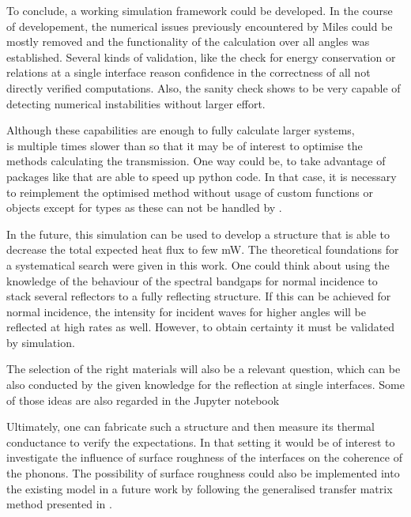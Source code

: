 To conclude, a working simulation framework could be developed. In the course
of developement, the numerical issues previously encountered by Miles could be
mostly removed and the functionality of the calculation over all angles was
established. Several kinds
of validation, like the check for energy conservation or relations at a single
interface reason confidence in the correctness of all not directly verified
computations. Also, the sanity check shows to be very capable of detecting
numerical instabilities without larger effort.

Although these capabilities are enough to fully calculate larger systems,\\
 is multiple times slower than 
so that it may be of interest to optimise the methods calculating the
transmission. One way could be, to take advantage of packages like 
that are able to speed up python code. In that case, it is necessary to
reimplement the optimised method without usage of custom functions or objects
except for  types as these can not be handled by .

In the future, this simulation can be used to develop a structure that is able
to decrease the total expected heat flux to few mW. The theoretical foundations
for a systematical search were given in this work. One could think about using
the knowledge of the behaviour of the spectral bandgaps for normal incidence
to stack several reflectors to a fully reflecting structure. If this can be
achieved for normal incidence, the intensity for incident waves for higher
angles will be reflected at high rates as well. However, to obtain certainty it
must be validated by simulation.

The selection of the right materials will also be a relevant question, which
can be also conducted by the given knowledge for the reflection at single
interfaces. Some of those ideas are also regarded in the Jupyter notebook

Ultimately, one can fabricate such a structure and then measure its thermal conductance
to verify the expectations. In that setting it would be of interest to investigate the
influence of surface roughness of the interfaces on the coherence of the
phonons. The possibility of surface roughness could also be implemented into
the existing model in a future work by following the generalised transfer matrix method
presented in \cite{Katsidis2002}.
